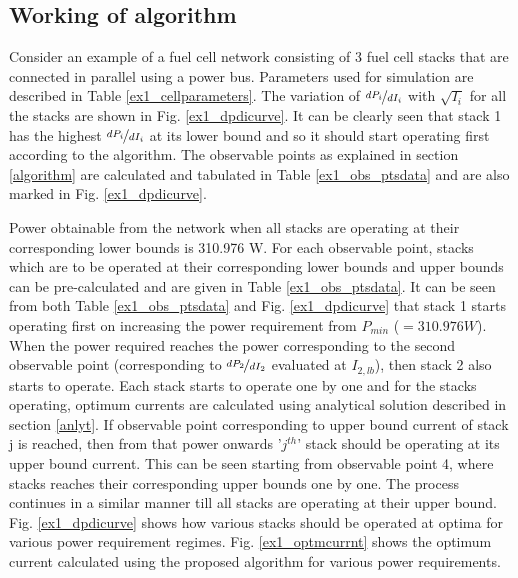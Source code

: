 \documentclass[twocolumn]{autart}
\begin{document}
\subsection{Working of algorithm}
Consider an example of a fuel cell network consisting of 3 fuel cell stacks that are connected in parallel using a power bus. Parameters used for simulation are described in Table \ref{ex1_cellparameters}. The variation of $\nicefrac{dP_i}{dI_i}$ with $\sqrt{I_i}$ for all the stacks are shown in Fig. \ref{ex1_dpdicurve}. It can be clearly seen that stack 1 has the highest $\nicefrac{dP_i}{dI_i}$ at its lower bound and so it should start operating first according to the algorithm. The observable points as explained in section \ref{algorithm} are calculated and tabulated in Table \ref{ex1_obs_ptsdata} and are also marked in Fig. \ref{ex1_dpdicurve}. 
\begin{table}[h]
  \centering
  \caption{Parameters for a fuel cell network with 3 fuel cell stacks}
    \label{ex1_cellparameters}\end{table}Power obtainable from the network when all stacks are operating at their corresponding lower bounds is 310.976 W. For each observable point, stacks which are to be operated at their corresponding lower bounds and upper bounds can be pre-calculated and are given in Table \ref{ex1_obs_ptsdata}. It can be seen from both Table \ref{ex1_obs_ptsdata} and Fig. \ref{ex1_dpdicurve} that stack 1 starts operating first on increasing the power requirement from $P_{min}$ ($= 310.976 W$). When the power required reaches the power corresponding to the second observable point (corresponding to $\nicefrac{dP_2}{dI_2}$ evaluated at $I_{2,lb}$), then stack 2 also starts to operate. Each stack starts to operate one by one and for the stacks operating, optimum currents are calculated using analytical solution described in section \ref{anlyt}. If observable point corresponding to upper bound current of stack j is reached, then from that power onwards '$j^{th}$' stack should be operating at its upper bound current. This can be seen starting from observable point 4, where stacks reaches their corresponding upper bounds one by one. The process continues in a similar manner till all stacks are operating at their upper bound. Fig. \ref{ex1_dpdicurve} shows how various stacks should be operated at optima for various power requirement regimes. Fig. \ref{ex1_optmcurrnt} shows the optimum current calculated using the proposed algorithm for various power requirements.
\end{document}
